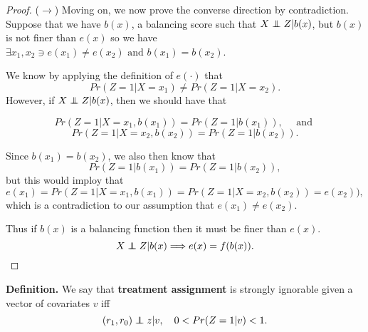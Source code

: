 \documentclass{article}
\newcommand\independent{\protect\mathpalette{\protect\independenT}{\perp}}
\def\independenT#1#2{\mathrel{\rlap{$#1#2$}\mkern2mu{#1#2}}}
\newcommand{\vocab}[1]{\textcolor{PineGreen}{\textbf{#1}}}
\begin{document}
\begin{proof}
% 
% 
% 
% 
% 
% 


    ($\rightarrow$) Moving on, we now prove the converse direction by contradiction.  Suppose that we have $b(x)$, a balancing score such that $X \independent Z | b(x)$, but $b(x)$ is not finer than $e(x)$ so we have $\exists x_1, x_2 \ni e(x_1) \neq e(x_2) \text{ and } b(x_1) = b(x_2)$. 

    We know by applying the definition of $e(\cdot)$ that 
    $$Pr(Z = 1 | X = x_1) \neq Pr(Z = 1 | X = x_2).$$
    However, if $X \independent Z | b(x)$, then we should have that 

    $$Pr(Z = 1 | X = x_1, b(x_1)) = Pr(Z=1 | b(x_1)), \quad \text{ and }$$
    $$Pr(Z = 1 | X = x_2, b(x_2)) = Pr(Z=1 | b(x_2)).$$

    Since $b(x_1) = b(x_2)$, we also then know that 
    $$Pr(Z=1 | b(x_1)) = Pr(Z=1 | b(x_2)),$$
    but this would imploy that 
    $$e(x_1) = Pr(Z = 1 | X = x_1, b(x_1)) = Pr(Z = 1 | X = x_2, b(x_2)) = e(x_2)),$$
    which is a contradiction to our assumption that $e(x_1) \neq e(x_2)$. 

    Thus if $b(x)$ is a balancing function then it must be finer than $e(x)$.
    $$X \independent Z | b(x) \Longrightarrow e(x) = f(b(x)).$$
\end{proof}

\textbf{Definition.} We say that \vocab{treatment assignment} is strongly ignorable given a vector of covariates $v$ iff 
$$(r_1,r_0) \independent z | v, \quad 0 < Pr(Z=1|v) < 1.$$
\end{document}
